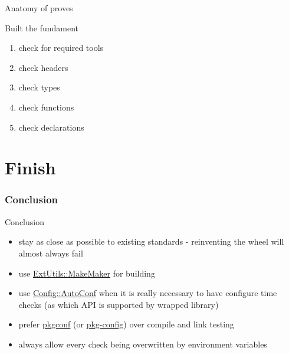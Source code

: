 \documentclass[ngerman,xcolor={table,dvipsnames},smaller,compress,hyperref={bookmarks,colorlinks}]{beamer}%
\begin{document}
\begin{frame}[fragile]{Anatomy of proves}
\begin{block}{Built the fundament}
\begin{enumerate}
\item check for required tools
\item<2-> check headers
\item<3-> check types
\item<4-> check functions
\item<5-> check declarations
\end{enumerate}

\end{block}
\end{frame}


\part{Finish}

\section{Conclusion}

\begin{frame}[fragile]{Conclusion}
\begin{block}{}
\begin{itemize}
\item stay as close as possible to existing standards - reinventing the wheel will almost always fail
\item<2-> use \href{https://metacpan.org/release/ExtUtils-MakeMaker}{ExtUtils::MakeMaker} for building
\item<3-> use \href{https://metacpan.org/release/Config-AutoConf}{Config::AutoConf} when it is really necessary to have configure time checks (as which API is supported by wrapped library)
\item<3-> prefer \href{https://github.com/pkgconf/pkgconf}{pkgconf} (or \href{https://en.wikipedia.org/wiki/Pkg-config}{pkg-config}) over compile and link testing
\item<4-> always allow every check being overwritten by environment variables
\end{itemize}
\end{block}
\end{frame}
\end{document}
